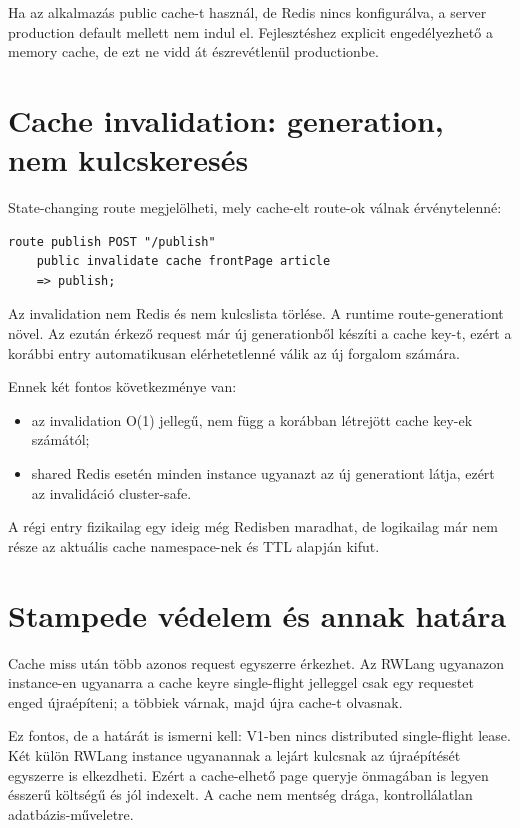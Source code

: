 Ha az alkalmazás public cache-t használ, de Redis nincs konfigurálva, a server production default mellett nem indul el. Fejlesztéshez explicit engedélyezhető a memory cache, de ezt ne vidd át észrevétlenül productionbe.

\section{Cache invalidation: generation, nem kulcskeresés}

State-changing route megjelölheti, mely cache-elt route-ok válnak érvénytelenné:

\begin{lstlisting}[language=RWLang]
route publish POST "/publish"
    public invalidate cache frontPage article
    => publish;
\end{lstlisting}

Az invalidation nem Redis  és nem kulcslista törlése. A runtime route-generationt növel. Az ezután érkező request már új generationből készíti a cache key-t, ezért a korábbi entry automatikusan elérhetetlenné válik az új forgalom számára.

Ennek két fontos következménye van:

\begin{itemize}
  \item az invalidation O(1) jellegű, nem függ a korábban létrejött cache key-ek számától;
  \item shared Redis esetén minden instance ugyanazt az új generationt látja, ezért az invalidáció cluster-safe.
\end{itemize}

A régi entry fizikailag egy ideig még Redisben maradhat, de logikailag már nem része az aktuális cache namespace-nek és TTL alapján kifut.

\section{Stampede védelem és annak határa}

Cache miss után több azonos request egyszerre érkezhet. Az RWLang ugyanazon instance-en ugyanarra a cache keyre single-flight jelleggel csak egy requestet enged újraépíteni; a többiek várnak, majd újra cache-t olvasnak.

Ez fontos, de a határát is ismerni kell: V1-ben nincs distributed single-flight lease. Két külön RWLang instance ugyanannak a lejárt kulcsnak az újraépítését egyszerre is elkezdheti. Ezért a cache-elhető page queryje önmagában is legyen ésszerű költségű és jól indexelt. A cache nem mentség drága, kontrollálatlan adatbázis-műveletre.

